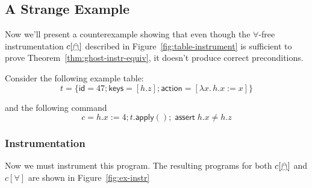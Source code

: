 \documentclass{article}
\newcommand{\action}{\mathsf{action}}
\newcommand{\keys}{\mathsf{keys}}
\newcommand{\id}{\mathsf{id}}
\newcommand{\assert}{\mathop{\mathsf{assert}}}
\newcommand{\apply}{\mathsf{apply}}
\newcommand{\instr}{[\forall]}
\newcommand{\ginstr}{[\mathghost]}
\begin{document}
\subsection{A Strange Example}

Now we'll present a counterexample showing that even though the
$\forall$-free instrumentation $c\ginstr$ described in
Figure~\ref{fig:table-instrument} is sufficient to prove
Theorem~\ref{thm:ghost-instr-equiv}, it doesn't produce correct preconditions.

\begin{samepage}
Consider the following example table:
\[t = \{\id = 47; \keys = [h.z]; \action = [\lambda x.\,h.x := x] \}\]

and the following command
\[c = h.x := 4; t.\apply(); \assert h.x \neq h.z\]
\end{samepage}

\subsubsection{Instrumentation}

Now we must instrument this program. The resulting programs for both $c\ginstr$ and $c\instr$ are shown in Figure~\ref{fig:ex-instr}
\end{document}
